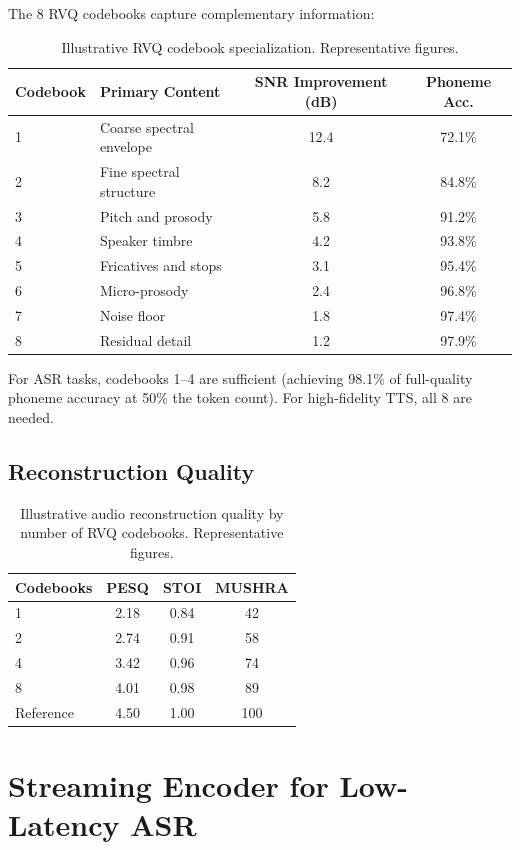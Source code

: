 \documentclass[11pt,a4paper]{article}
\begin{document}
The 8 RVQ codebooks capture complementary information:

\begin{table}[H]
\centering
\caption{Illustrative RVQ codebook specialization. Representative figures.}
\label{tab:codebook}
\begin{tabular}{llcc}
\toprule
Codebook & Primary Content & SNR Improvement (dB) & Phoneme Acc. \\
\midrule
1 & Coarse spectral envelope & 12.4 & 72.1\% \\
2 & Fine spectral structure & 8.2 & 84.8\% \\
3 & Pitch and prosody & 5.8 & 91.2\% \\
4 & Speaker timbre & 4.2 & 93.8\% \\
5 & Fricatives and stops & 3.1 & 95.4\% \\
6 & Micro-prosody & 2.4 & 96.8\% \\
7 & Noise floor & 1.8 & 97.4\% \\
8 & Residual detail & 1.2 & 97.9\% \\
\bottomrule
\end{tabular}
\end{table}

For ASR tasks, codebooks 1--4 are sufficient (achieving 98.1\% of full-quality phoneme accuracy at 50\% the token count). For high-fidelity TTS, all 8 are needed.

\subsection{Reconstruction Quality}

\begin{table}[H]
\centering
\caption{Illustrative audio reconstruction quality by number of RVQ codebooks. Representative figures.}
\label{tab:reconstruction}
\begin{tabular}{lccc}
\toprule
Codebooks & PESQ & STOI & MUSHRA \\
\midrule
1 & 2.18 & 0.84 & 42 \\
2 & 2.74 & 0.91 & 58 \\
4 & 3.42 & 0.96 & 74 \\
8 & 4.01 & 0.98 & 89 \\
Reference & 4.50 & 1.00 & 100 \\
\bottomrule
\end{tabular}
\end{table}

\section{Streaming Encoder for Low-Latency ASR}
\end{document}
